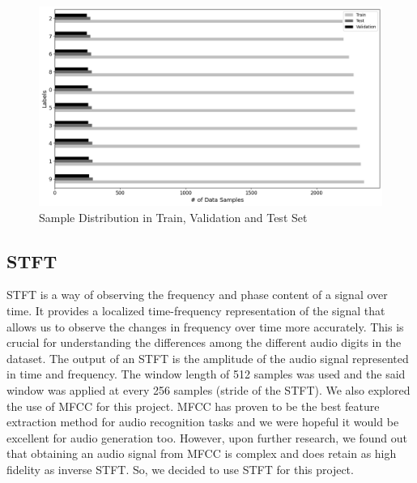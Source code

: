 \documentclass[12pt]{article}
\begin{document}
\begin{figure}[!h]
    \centering
    \includegraphics[width=0.75\linewidth]{figures/train_test.png}
    \caption{Sample Distribution in Train, Validation and Test Set}
    \label{fig:enter-label}
\end{figure}


\subsection{STFT}
STFT is a way of observing the frequency and phase content of a signal over time. It provides a localized time-frequency representation of the signal that allows us to observe the changes in frequency over time more accurately. This is crucial for understanding the differences among the different audio digits in the dataset. The output of an STFT is the amplitude of the audio signal represented in time and frequency. The window length of 512 samples was used and the said window was applied at every 256 samples (stride of the STFT). We also explored the use of MFCC for this project. MFCC has proven to be the best feature extraction method for audio recognition tasks and we were hopeful it would be excellent for audio generation too. However, upon further research, we found out that obtaining an audio signal from MFCC is complex and does retain as high fidelity as inverse STFT. So, we decided to use STFT for this project.
\end{document}
